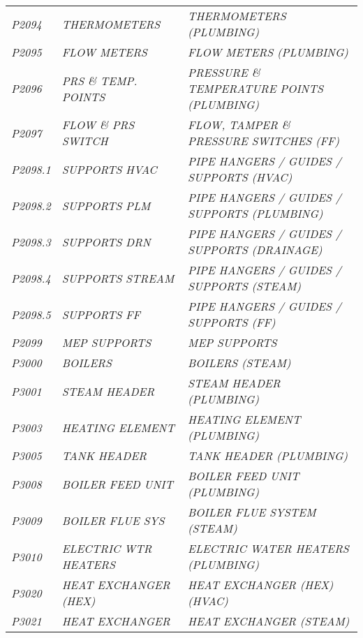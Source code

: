 \begin{landscape}
\begin{longtable}[l]{l%
                  l|%
                  l|}
\itshape P2094       &\itshape THERMOMETERS           &\itshape THERMOMETERS (PLUMBING)   \\
\itshape P2095       &\itshape FLOW METERS            &\itshape FLOW METERS (PLUMBING)   \\
\itshape P2096       &\itshape PRS \& TEMP. POINTS    &\itshape PRESSURE \& TEMPERATURE POINTS (PLUMBING)   \\
\itshape P2097       &\itshape FLOW \& PRS SWITCH     &\itshape FLOW, TAMPER \& PRESSURE SWITCHES (FF)   \\
\itshape P2098.1     &\itshape SUPPORTS HVAC   		  &\itshape PIPE HANGERS / GUIDES / SUPPORTS (HVAC)   \\
\itshape P2098.2     &\itshape SUPPORTS PLM   		  &\itshape PIPE HANGERS / GUIDES / SUPPORTS (PLUMBING)   \\
\itshape P2098.3     &\itshape SUPPORTS DRN   		  &\itshape PIPE HANGERS / GUIDES / SUPPORTS (DRAINAGE)   \\
\itshape P2098.4     &\itshape SUPPORTS STREAM   	  &\itshape PIPE HANGERS / GUIDES / SUPPORTS (STEAM)   \\
\itshape P2098.5     &\itshape SUPPORTS FF            &\itshape PIPE HANGERS / GUIDES / SUPPORTS (FF)   \\
\itshape P2099       &\itshape MEP SUPPORTS           &\itshape MEP SUPPORTS   \\
\itshape P3000       &\itshape BOILERS                &\itshape BOILERS (STEAM)   \\
\itshape P3001       &\itshape STEAM HEADER           &\itshape STEAM HEADER (PLUMBING)   \\
\itshape P3003       &\itshape HEATING ELEMENT        &\itshape HEATING ELEMENT (PLUMBING)   \\
\itshape P3005       &\itshape TANK HEADER            &\itshape TANK HEADER (PLUMBING)   \\
\itshape P3008       &\itshape BOILER FEED UNIT       &\itshape BOILER FEED UNIT (PLUMBING)   \\
\itshape P3009       &\itshape BOILER FLUE SYS        &\itshape BOILER FLUE SYSTEM (STEAM)   \\
\itshape P3010       &\itshape ELECTRIC WTR HEATERS   &\itshape ELECTRIC WATER HEATERS (PLUMBING)   \\
\itshape P3020       &\itshape HEAT EXCHANGER (HEX)   &\itshape HEAT EXCHANGER (HEX) (HVAC)   \\
\itshape P3021       &\itshape HEAT EXCHANGER         &\itshape HEAT EXCHANGER (STEAM)   \\

\end{longtable}
\end{landscape}
